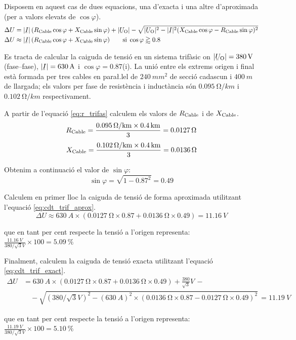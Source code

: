 Disposem en aquest cas de dues equacions, una d'exacta i una altre d'aproximada (per a valors elevats de $\cos \varphi$).
\begin{subequations}
\begin{align}
   \Delta U &= |\cmplx{I}| \,( R\ped{Cable} \cos \varphi + X\ped{Cable} \sin \varphi) + |\cmplx{U}\ped{O}| - \sqrt{|\cmplx{U}\ped{O}|^2 - |\cmplx{I}|^2 ( X\ped{Cable} \cos \varphi - R\ped{Cable} \sin \varphi )^2} \label{eq:cdt_trif_exact} \\
   \Delta U &\approx |\cmplx{I}| \,( R\ped{Cable} \cos \varphi + X\ped{Cable} \sin \varphi) \qquad \text{si} \; \cos \varphi \gtrapprox \num{0,8} \label{eq:cdt_trif_aprox}
\end{align}
\end{subequations}

\vspace{2mm}
\begin{exemple}
   Es tracta de calcular la caiguda de tensi\'{o} en un sistema trif\`{a}sic on $|\cmplx{U}\ped{O}| = \SI{380}{V}$ (fase--fase), $|\cmplx{I}|=\SI{630}{A}$ i $\cos \varphi = \num{0,87}$(i). La uni\'{o} entre els extrems origen  i final est\`{a} formada per tres cables en para{\l.l}el de $\SI{240}{mm^2}$ de secci\'{o} cadascun i $\SI{400}{m}$ de llargada; els valors per fase de resist\`{e}ncia i induct\`{a}ncia s\'{o}n $\SI{0,095}{\ohm/km}$ i $\SI{0,102}{\ohm/km}$ respectivament.

A partir de l'equaci\'{o} \eqref{eq:r_trifas} calculem els valors de $R_\mathrm{Cable}$ i de $X_\mathrm{Cable}$.
\[
   R_\mathrm{Cable} = \frac{\SI{0,095}{\ensuremath{\mathrm{\Omega}}/km}\times \SI{0,4}{km}}{3} = \SI{0,0127}{\ensuremath{\mathrm{\Omega}}}
\]
\[
   X_\mathrm{Cable} = \frac{\SI{0,102}{\ensuremath{\mathrm{\Omega}}/km}\times \SI{0,4}{km}}{3} = \SI{0,0136}{\ensuremath{\mathrm{\Omega}}}
\]

Obtenim a continuaci\'{o} el valor de $\sin \varphi$:
\[
   \sin \varphi = \sqrt{1-\num{0,87}^2} = \num{0,49}
\]

Calculem en primer lloc la caiguda de tensi\'{o} de forma aproximada utilitzant l'equaci\'{o} \eqref{eq:cdt_trif_aprox}.
\[
   \Delta U \approx \SI{630}{A} \times ( \SI{0,0127}{\ohm} \times \num{0,87} + \SI{0,0136}{\ohm} \times \num{0,49} ) = \SI{11,16}{V}
\]

que en tant per cent respecte la tensi\'{o} a l'origen representa:
$\frac{\SI{11,16}{V}}{380/\sqrt{3}\unit{V}} \times 100 = \SI{5,09}{\%} $

Finalment, calculem la caiguda de tensi\'{o} exacta utilitzant l'equaci\'{o} \eqref{eq:cdt_trif_exact}.
\[ \begin{split}
   \Delta U &=  \SI{630}{A} \times( \SI{0,0127}{\ohm} \times \num{0,87} + \SI{0,0136}{\ohm} \times \num{0,49}) + \frac{380}{\sqrt{3}}\unit{V} \,- \\
    & \quad - \sqrt{\left(380/\sqrt{3}\unit{V}\right)^2 - \left(\SI{630}{A}\right)^2 \times  \left( \SI{0,0136}{\ohm} \times \num{0,87} - \SI{0,0127}{\ohm} \times \num{0,49} \right)^2 } \,= \SI{11,19}{V}
\end{split} \]

que en tant per cent respecte la tensi\'{o} a l'origen representa:
$\frac{\SI{11,19}{V}}{380/\sqrt{3}\unit{V}} \times 100 = \SI{5,10}{\%} $
\end{exemple}


